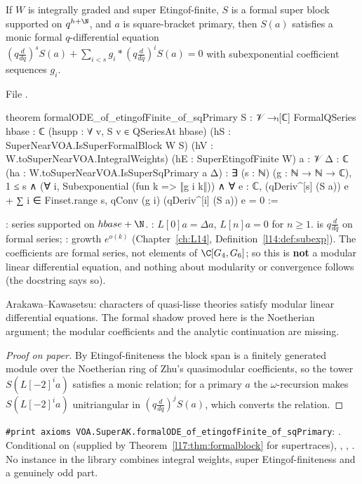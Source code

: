 \begin{theorem}\label{l17:thm:AK}
If $W$ is integrally graded and super Etingof-finite, $S$ is a formal super block supported on
$q^{h+\N}$, and $a$ is square-bracket primary, then $S(a)$ satisfies a monic formal $q$-differential
equation $(q\frac d{dq})^sS(a)+\sum_{i<s}g_i\ast(q\frac d{dq})^iS(a)=0$ with subexponential coefficient
sequences $g_i$.
\end{theorem}
\noindent File .
\begin{leancode}
theorem formalODE_of_etingofFinite_of_sqPrimary {S : 𝒱 →ₗ[ℂ] FormalQSeries} {hbase : ℂ}
    (hsupp : ∀ v, S v ∈ QSeriesAt hbase) (hS : SuperNearVOA.IsSuperFormalBlock W S)
    (hV : W.toSuperNearVOA.IntegralWeights) (hE : SuperEtingofFinite W) {a : 𝒱} {Δ : ℂ}
    (ha : W.toSuperNearVOA.IsSuperSqPrimary a Δ) :
    ∃ (s : ℕ) (g : ℕ → ℕ → ℂ), 1 ≤ s ∧ (∀ i, Subexponential (fun k => ‖g i k‖)) ∧
      ∀ e : ℂ, (qDeriv^[s] (S a)) e
        + ∑ i ∈ Finset.range s, qConv (g i) (qDeriv^[i] (S a)) e = 0 :=
\end{leancode}
\begin{dictionary}
: series supported on $hbase+\N$. : $L[0]a=\Delta a$,
$L[n]a=0$ for $n\ge1$.  is $q\frac d{dq}$ on formal series; : growth
$e^{o(k)}$ (Chapter~\ref{ch:L14}, Definition~\ref{l14:def:subexp}). The coefficients are formal series,
not elements of $\C[G_4,G_6]$; so this is \textbf{not} a modular linear differential equation, and
nothing about modularity or convergence follows (the docstring says so).
\end{dictionary}
\begin{physics}
Arakawa--Kawasetsu: characters of quasi-lisse theories satisfy modular linear differential equations.
The formal shadow proved here is the Noetherian argument; the modular coefficients and the analytic
continuation are missing.
\end{physics}
\begin{proof}[Proof on paper]
By Etingof-finiteness the block span is a finitely generated module over the Noetherian ring of Zhu's
quasimodular coefficients, so the tower $S(L[-2]^ia)$ satisfies a monic relation; for a primary $a$ the
$\omega$-recursion makes $S(L[-2]^ia)$ unitriangular in $(q\frac d{dq})^jS(a)$, which converts the relation.
\end{proof}
\begin{status}
\texttt{\#print axioms VOA.SuperAK.formalODE\_of\_etingofFinite\_of\_sqPrimary}: . Conditional on  (supplied by Theorem~\ref{l17:thm:formalblock}
for supertraces), , , . No instance in the library combines integral weights,
super Etingof-finiteness and a genuinely odd part.
\end{status}


